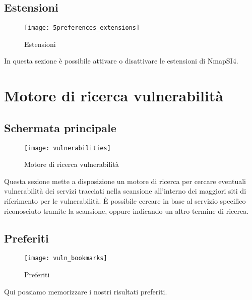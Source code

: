 \section{Estensioni}
\label{sec:PreferencesExtensions}

\begin{figure}[h]
  \centering
  \texttt{[image: 5preferences\_extensions]}
  \caption{Estensioni}
  \label{fig:PreferencesExtensions}
\end{figure}
In questa sezione \`e possibile attivare o disattivare le estensioni di NmapSI4.

\chapter{Motore di ricerca vulnerabilit\`a}
\label{ch:Vulnerability}

\section{Schermata principale}
\label{sec:VulnerabilityMain}

\begin{figure}[h]
  \centering
  \texttt{[image: vulnerabilities]}
  \caption{Motore di ricerca vulnerabilit\`a}
  \label{fig:VulnerabilityMain}
\end{figure}
Questa sezione mette a disposizione un motore di ricerca per cercare eventuali 
vulnerabilit\`a dei servizi tracciati nella scansione all'interno dei maggiori 
siti di riferimento per le vulnerabilit\`a. \`E possibile cercare in base al 
servizio specifico riconosciuto tramite la scansione, oppure indicando un altro 
termine di ricerca.

\section{Preferiti}
\label{sec:VulnerabilityBookmarks}

\begin{figure}[h]
  \centering
  \texttt{[image: vuln\_bookmarks]}
  \caption{Preferiti}
  \label{fig:VulnerabilityBookmarks}
\end{figure}
Qui possiamo memorizzare i nostri risultati preferiti.

